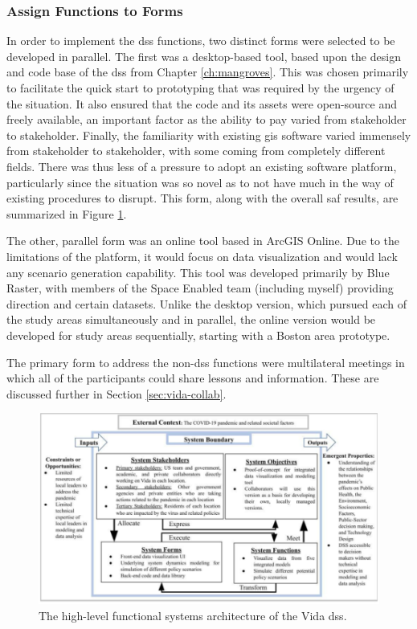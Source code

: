 \subsubsection{Assign Functions to Forms}

In order to implement the \ac{dss} functions, two distinct forms were selected to be developed in parallel. The first was a desktop-based tool, based upon the design and code base of the \ac{dss} from Chapter \ref{ch:mangroves}. This was chosen primarily to facilitate the quick start to prototyping that was required by the urgency of the situation. It also ensured that the code and its assets were open-source and freely available, an important factor as the ability to pay varied from stakeholder to stakeholder. Finally, the familiarity with existing \ac{gis} software varied immensely from stakeholder to stakeholder, with some coming from completely different fields. There was thus less of a pressure to adopt an existing software platform, particularly since the situation was so novel as to not have much in the way of existing procedures to disrupt. This form, along with the overall \ac{saf} results, are summarized in Figure \ref{fig:vida-architecture}.

The other, parallel form was an online tool based in ArcGIS Online. Due to the limitations of the platform, it would focus on data visualization and would lack any scenario generation capability. This tool was developed primarily by Blue Raster, with members of the Space Enabled team (including myself) providing direction and certain datasets. Unlike the desktop version, which pursued each of the study areas simultaneously and in parallel, the online version would be developed for study areas sequentially, starting with a Boston area prototype.

The primary form to address the non-\ac{dss} functions were multilateral meetings in which all of the participants could share lessons and information. These are discussed further in Section \ref{sec:vida-collab}.


\begin{figure}[!htb]
	\centering
	\includegraphics[scale=0.4]{Figures/chap5/architecture.png}
	\caption{The high-level functional systems architecture of the Vida \ac{dss}.}
	\label{fig:vida-architecture}
\end{figure}

